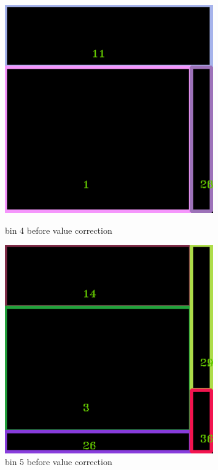 \documentclass[11pt]{article}
\begin{document}
    \begin{figure}
    \begin{minipage}[htb]{0.33\linewidth}
    \centering
    \includegraphics[width=0.8\textwidth]{FIGS/1/output4.png}
    \caption{bin 4 before value correction}
    \label{skyline}
    \end{minipage}
    \begin{minipage}[htb]{0.33\linewidth}
    \centering
    \includegraphics[width=0.8\textwidth]{FIGS/1/output5.png}
    \caption{bin 5 before value correction}
    \label{skyline}
    \end{minipage}

\end{figure}
\end{document}
